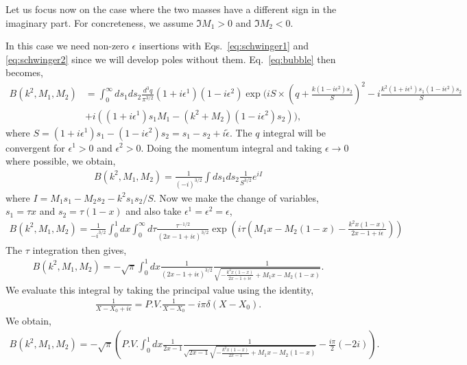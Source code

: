 \documentclass[twoside]{article}
\begin{document}
Let us focus now on the case where the two masses have a different sign in the imaginary part. For concreteness, we assume $\Im M_1 > 0$ and $\Im M_2 < 0$.

In this case we need non-zero $\epsilon$ insertions with Eqs.~\eqref{eq:schwinger1} and \eqref{eq:schwinger2} since we will develop poles without them. Eq.~\eqref{eq:bubble} then becomes,
\begin{align}
 B(k^2, M_1, M_2) &= \int_0^\infty ds_1 ds_2\frac{d^3q}{\pi^{3/2}}(1 + i\epsilon^1)(1 - i\epsilon^2)\exp\Big( i S \times \left( q + \frac{k(1 - i\epsilon^2)s_2}{S} \right)^2 - i\frac{k^2(1+i\epsilon^1) s_1 (1-i\epsilon^2) s_2}{S} \nonumber \\
&+ i\left( (1 + i\epsilon^1)s_1 M_1 - (k^2 + M_2)(1 - i\epsilon^2)s_2 \right) \Big),
\end{align}
where $S = (1 + i\epsilon^1)s_1 - (1-i\epsilon^2)s_2 = s_1 - s_2 + i \tilde{\epsilon}$. The $q$ integral will be convergent for $\epsilon^1 > 0$ and $\epsilon^2 > 0$. Doing the momentum integral and taking $\epsilon \rightarrow 0$ where possible, we obtain,
\begin{align}
  B(k^2, M_1,M_2) = \frac{1}{(-i)^{3/2}}\int ds_1ds_2\frac{1}{S^{3/2}}e^{iI}
\end{align}
where $I = M_1 s_1 - M_2 s_2 - k^2 s_1s_2/S$. Now we make the
change of variables, $s_1 = \tau x$ and $s_2 = \tau(1-x)$ and also take $\epsilon^1 = \epsilon^2 = \epsilon$,
\begin{align}
  B(k^2,M_1,M_2) = \frac{1}{-i^{3/2}}\int^1_0dx\int^{\infty}_0d\tau \frac{\tau^{-1/2}}{(2x-1 + i\epsilon)^{3/2}}\exp\left( i\tau\left(
      M_1 x - M_2(1-x) - \frac{k^2x(1-x)}{2x-1 + i\epsilon}
  \right)\right)
\end{align}
The $\tau$ integration then gives,
\begin{align}
 B(k^2,M_1,M_2) =   -\sqrt{\pi}\int^1_0dx \frac{1}{(2x - 1 + i\epsilon)^{3/2}}\frac{1}{\sqrt{-\frac{k^2x(1-x)}{2x-1+ i\epsilon} + M_1x - M_2(1-x)}}.
\end{align}
We evaluate this integral by taking the principal value using the identity,
\begin{align}
  \frac{1}{X - X_0+ i\epsilon} = P.V.\frac{1}{X-X_0} - i\pi \delta  (X- X_0) .
\end{align}
We obtain,
\begin{align}
\label{eq:PVintegral}
 B(k^2,M_1,M_2) = -\sqrt{\pi}\left(P.V. \int^1_0dx \frac{1}{2x - 1}\frac{1}{\sqrt{2x - 1}\sqrt{-\frac{k^2x(1-x)}{2x-1} + M_1x - M_2(1-x)}} -\frac{i \pi}{2} (-2 i) \right).
\end{align}
\end{document}

